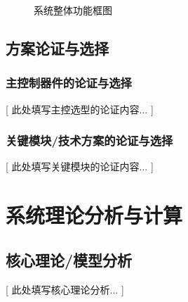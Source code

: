 \documentclass[UTF-8,zihao=-4]{ctexart}
\begin{document}
\begin{figure}[H]
	\centering
	\caption{系统整体功能框图}
	\label{fig:system_block}
\end{figure}

\subsection{方案论证与选择}
\subsubsection{主控制器件的论证与选择}
    [ 此处填写主控选型的论证内容... ]

\subsubsection{关键模块/技术方案的论证与选择}
    [ 此处填写关键模块的论证内容... ]

\section{系统理论分析与计算}
\subsection{核心理论/模型分析}
    [ 此处填写核心理论分析... ]
    
    
\end{document}
